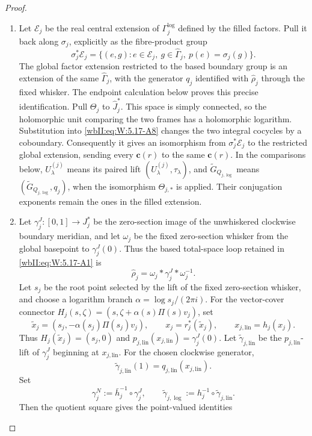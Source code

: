 \begin{proof}
\begin{enumerate}[label=\arabic*.,leftmargin=*]
\item Let \(\mathscr E_j\) be the real central extension of
\(\Gamma_j^{\log}\) defined by the filled factors.  Pull it back along
\(\sigma_j\), explicitly as the fibre-product group
\[
 \sigma_j^*\mathscr E_j=
 \{(e,g):e\in\mathscr E_j,\ g\in\widehat\Gamma_j,
           \ p(e)=\sigma_j(g)\}.
\]
The global factor extension restricted to the based boundary group is
an extension of the same \(\widehat\Gamma_j\), with the generator
\(q_j\) identified with \(\widehat\rho_j\) through the fixed whisker.
The endpoint calculation below proves this precise identification.
Pull \(\Theta_j\) to \(\widehat J_j^*\).  This space is simply
connected, so the holomorphic unit comparing the two frames has a
holomorphic logarithm.  Substitution into \eqref{wbII:eq:W:5.17-A8}
changes the two integral cocycles by a coboundary.  Consequently it gives
an isomorphism from \(\sigma_j^*\mathscr E_j\) to the restricted global
extension, sending every \(\mathbf c(r)\) to the same
\(\mathbf c(r)\).  In the comparisons below,
\(U_\lambda^{(j)}\) means its paired lift
\((U_\lambda^{(j)},\tau_\lambda)\), and
\(\widetilde G_{Q_{j,\log}}\) means
\((\widetilde G_{Q_{j,\log}},q_j)\), when the isomorphism
\(\Theta_{j,*}\) is applied.  Their conjugation exponents remain the
ones in the filled extension.  
\item Let \(\gamma_j^J:[0,1]\to J_j^*\) be the zero-section image of the
unwhiskered clockwise boundary meridian, and let \(\omega_j\) be the fixed
zero-section whisker from the global basepoint to \(\gamma_j^J(0)\).  Thus
the based total-space loop retained in \eqref{wbII:eq:W:5.17-A1} is
\[
 \widehat\rho_j=\omega_j*\gamma_j^J*\omega_j^{-1}.
\]
Let $s_j$ be the root point selected by the lift of the fixed zero-section
whisker, and choose a logarithm branch $\alpha=\log s_j/(2\pi i)$.  For the vector-cover connector
$H_j(s,\zeta)=(s,\zeta+\alpha(s)\Pi(s)v_j)$, set
\[
 \widetilde x_j=(s_j,-\alpha(s_j)\Pi(s_j)v_j),\qquad
 x_j=r_j^*(\widetilde x_j),\qquad x_{j,\mathrm{lin}}=h_j(x_j).
\]
Thus $H_j(\widetilde x_j)=(s_j,0)$ and
$p_{j,\mathrm{lin}}(x_{j,\mathrm{lin}})=\gamma_j^J(0)$.  Let
\(\widetilde\gamma_{j,\mathrm{lin}}\) be the
\(p_{j,\mathrm{lin}}\)-lift of \(\gamma_j^J\) beginning at
\(x_{j,\mathrm{lin}}\).  For the chosen clockwise generator,
\[
 \widetilde\gamma_{j,\mathrm{lin}}(1)
 =q_{j,\mathrm{lin}}(x_{j,\mathrm{lin}}).
\]
Set
\[
 \gamma_j^N:=\bar h_j^{-1}\circ\gamma_j^J,
 \qquad
 \widetilde\gamma_{j,\log}
 :=h_j^{-1}\circ\widetilde\gamma_{j,\mathrm{lin}}.
\]
Then the quotient square gives the point-valued identities

\end{enumerate}
\end{proof}
